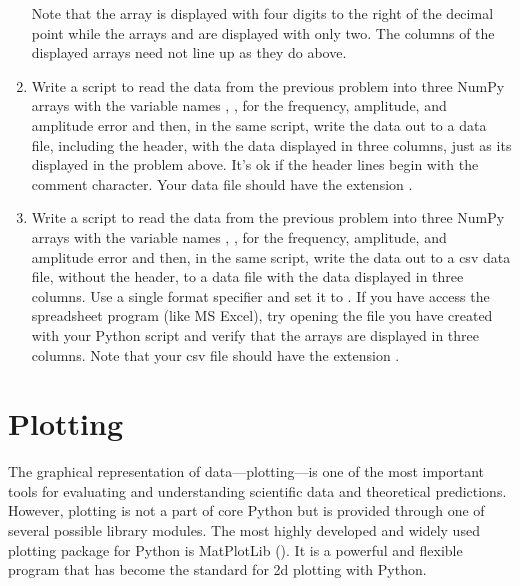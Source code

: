 \documentclass[letterpaper,10pt,english]{sphinxmanual}
\begin{document}
\begin{enumerate}
\sphinxAtStartPar
Note that the array  is displayed with four digits to the right of the decimal point while the arrays  and  are displayed with only two.  The columns of the displayed arrays need not line up as they do above.

\item {} 
\sphinxAtStartPar
Write a script to read the data from the previous problem into three NumPy arrays with the variable names , ,  for the frequency, amplitude, and amplitude error and then, in the same script, write the data out to a data file, including the header, with the data displayed in three columns, just as its displayed in the problem above.  It’s ok if the header lines begin with the \sphinxcode{\sphinxupquote{\#}} comment character.  Your data file should have the extension .

\item {} 
\sphinxAtStartPar
Write a script to read the data from the previous problem into three NumPy arrays with the variable names , ,  for the frequency, amplitude, and amplitude error and then, in the same script, write the data out to a csv data file, without the header, to a data file with the data displayed in three columns.  Use a single format specifier and set it to .  If you have access the spreadsheet program (like MS Excel), try opening the file you have created with your Python script and verify that the arrays are displayed in three columns.  Note that your csv file should have the extension .

\end{enumerate}

\sphinxstepscope


\chapter{Plotting}
\label{\detokenize{chap5/chap5_plot:plotting}}\label{\detokenize{chap5/chap5_plot:chap5}}\label{\detokenize{chap5/chap5_plot::doc}}
\ignorespaces 
\sphinxAtStartPar
The graphical representation of data—plotting—is one of the most important tools for evaluating and understanding scientific data and theoretical predictions.  However, plotting is not a part of core Python but is provided through one of several possible library modules.  The most highly developed and widely used plotting package for Python is MatPlotLib ().  It is a powerful and flexible program that has become the  standard for 2\sphinxhyphen{}d plotting with Python.
\end{document}
